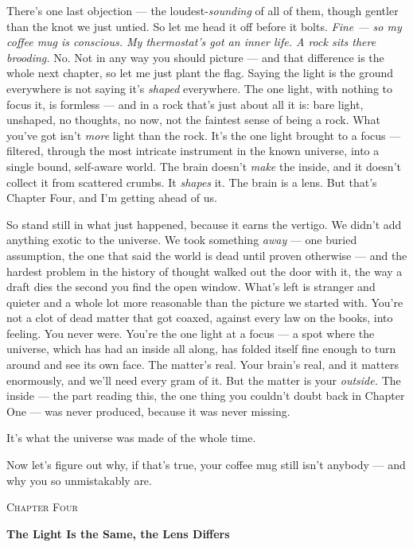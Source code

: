\documentclass[11pt,openany]{book}
\begin{document}
There’s one last objection — the loudest-\textit{sounding} of all of them, though gentler than the knot we just untied. So let me head it off before it bolts. \textit{Fine — so my coffee mug is conscious. My thermostat’s got an inner life. A rock sits there brooding.} No. Not in any way you should picture — and that difference is the whole next chapter, so let me just plant the flag. Saying the light is the ground everywhere is not saying it’s \textit{shaped} everywhere. The one light, with nothing to focus it, is formless — and in a rock that’s just about all it is: bare light, unshaped, no thoughts, no now, not the faintest sense of being a rock. What you’ve got isn’t \textit{more} light than the rock. It’s the one light brought to a focus — filtered, through the most intricate instrument in the known universe, into a single bound, self-aware world. The brain doesn’t \textit{make} the inside, and it doesn’t collect it from scattered crumbs. It \textit{shapes} it. The brain is a lens. But that’s Chapter Four, and I’m getting ahead of us.

So stand still in what just happened, because it earns the vertigo. We didn’t add anything exotic to the universe. We took something \textit{away} — one buried assumption, the one that said the world is dead until proven otherwise — and the hardest problem in the history of thought walked out the door with it, the way a draft dies the second you find the open window. What’s left is stranger and quieter and a whole lot more reasonable than the picture we started with. You’re not a clot of dead matter that got coaxed, against every law on the books, into feeling. You never were. You’re the one light at a focus — a spot where the universe, which has had an inside all along, has folded itself fine enough to turn around and see its own face. The matter’s real. Your brain’s real, and it matters enormously, and we’ll need every gram of it. But the matter is your \textit{outside.} The inside — the part reading this, the one thing you couldn’t doubt back in Chapter One — was never produced, because it was never missing.

It’s what the universe was made of the whole time.

Now let’s figure out why, if that’s true, your coffee mug still isn’t anybody — and why you so unmistakably are.


\clearpage
\vspace*{0.6in}
{\centering\scshape\large Chapter Four\par}
\vspace{0.8em}
{\centering\bfseries\fontsize{20}{24}\selectfont The Light Is the Same, the Lens Differs\par}
\vspace{1.6em}
\end{document}
